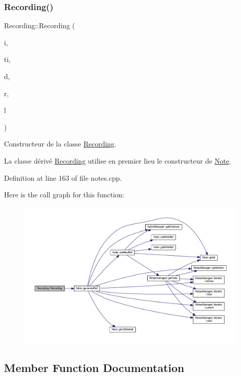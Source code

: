 \subsubsection{\texorpdfstring{Recording()}{Recording()}}
{\footnotesize\ttfamily Recording\+::\+Recording (\begin{DoxyParamCaption}\item[{const Q\+String}]{i,  }\item[{const Q\+String \&}]{ti,  }\item[{const Q\+String}]{d,  }\item[{E\+N\+U\+M\+::\+Recording\+Type}]{r,  }\item[{Q\+String}]{l }\end{DoxyParamCaption})}



Constructeur de la classe \hyperlink{class_recording}{Recording}. 

La classe dérivé \hyperlink{class_recording}{Recording} utilise en premier lieu le constructeur de \hyperlink{class_note}{Note}. 

Definition at line 163 of file notes.\+cpp.

Here is the call graph for this function\+:\nopagebreak
\begin{figure}[H]
\begin{center}
\leavevmode
\includegraphics[width=350pt]{class_recording_a2e3359660cd7573807fb46c15daf4e78_cgraph}
\end{center}
\end{figure}


\subsection{Member Function Documentation}
\mbox{\label{class_recording_ac5c7522d695c8a657f5e801df97a9e06}} 
